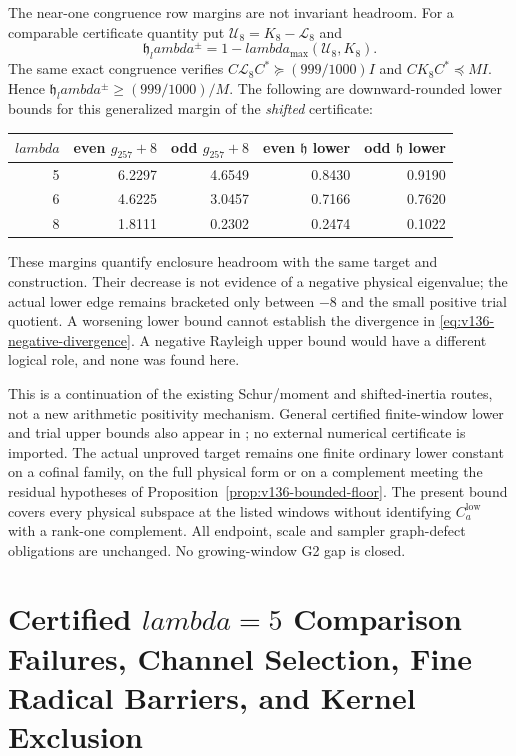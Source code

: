 \documentclass[11pt]{article}
\def\lambda{lambda}%
\theoremstyle{remark}
\begin{document}
The near-one congruence row margins are not invariant headroom.
For a comparable certificate quantity put
$\mathcal U_8=K_8-\mathcal L_8$ and
\[
 \mathfrak h_\lambda^\pm
 =1-\lambda_{\max}(\mathcal U_8,K_8).
\]
The same exact congruence verifies
$C\mathcal L_8C^*\succeq(999/1000)I$ and
$CK_8C^*\preceq M I$. Hence
$\mathfrak h_\lambda^\pm\ge(999/1000)/M$.
The following are downward-rounded lower bounds for this generalized
margin of the \emph{shifted} certificate:
\begin{center}
\begin{tabular}{rrrrr}
\toprule
$\lambda$ & even $g_{257}+8$ & odd $g_{257}+8$
 & even $\mathfrak h$ lower & odd $\mathfrak h$ lower\\
\midrule
5&6.2297&4.6549&0.8430&0.9190\\
6&4.6225&3.0457&0.7166&0.7620\\
8&1.8111&0.2302&0.2474&0.1022\\
\bottomrule
\end{tabular}
\end{center}
These margins quantify enclosure headroom with the same target and
construction. Their decrease is not evidence of a negative physical
eigenvalue; the actual lower edge remains bracketed only between
$-8$ and the small positive trial quotient. A worsening lower bound
cannot establish the divergence in
\eqref{eq:v136-negative-divergence}. A negative Rayleigh upper bound
would have a different logical role, and none was found here.

This is a continuation of the existing Schur/moment and shifted-inertia
routes, not a new arithmetic positivity mechanism. General certified
finite-window lower and trial upper bounds also appear in
\cite{Zhu2026}; no external numerical certificate is imported.
The actual unproved target remains one finite ordinary lower constant
on a cofinal family, on the full physical form or on a complement
meeting the residual hypotheses of Proposition~\ref{prop:v136-bounded-floor}.
The present bound covers every physical subspace at the listed windows
without identifying $C_a^{\mathrm{low}}$ with a rank-one complement.
All endpoint, scale and sampler graph-defect obligations are unchanged.
No growing-window G2 gap is closed.



\section{Certified \texorpdfstring{$\lambda=5$}{lambda=5} Comparison Failures, Channel Selection, Fine Radical Barriers, and Kernel Exclusion}\label{sec:pillar3b}
\end{document}
